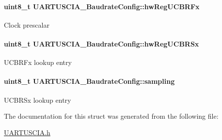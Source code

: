 \paragraph[{hw\+Reg\+U\+C\+B\+R\+Fx}]{\setlength{\rightskip}{0pt plus 5cm}uint8\+\_\+t U\+A\+R\+T\+U\+S\+C\+I\+A\+\_\+\+Baudrate\+Config\+::hw\+Reg\+U\+C\+B\+R\+Fx}\label{struct_u_a_r_t_u_s_c_i_a___baudrate_config_ad0e8c8dfaee0456a272bcaf7625b5998}
Clock prescalar 
\paragraph[{hw\+Reg\+U\+C\+B\+R\+Sx}]{\setlength{\rightskip}{0pt plus 5cm}uint8\+\_\+t U\+A\+R\+T\+U\+S\+C\+I\+A\+\_\+\+Baudrate\+Config\+::hw\+Reg\+U\+C\+B\+R\+Sx}\label{struct_u_a_r_t_u_s_c_i_a___baudrate_config_a638b5df1c71e9495f489a1e4ea5aa2c4}
U\+C\+B\+R\+Fx lookup entry 
\paragraph[{sampling}]{\setlength{\rightskip}{0pt plus 5cm}uint8\+\_\+t U\+A\+R\+T\+U\+S\+C\+I\+A\+\_\+\+Baudrate\+Config\+::sampling}\label{struct_u_a_r_t_u_s_c_i_a___baudrate_config_a6c78a1a4babef0a3723616d2ae4e7b9e}
U\+C\+B\+R\+Sx lookup entry 

The documentation for this struct was generated from the following file\+:\begin{DoxyCompactItemize}
\item 
\hyperlink{_u_a_r_t_u_s_c_i_a_8h}{U\+A\+R\+T\+U\+S\+C\+I\+A.\+h}\end{DoxyCompactItemize}
